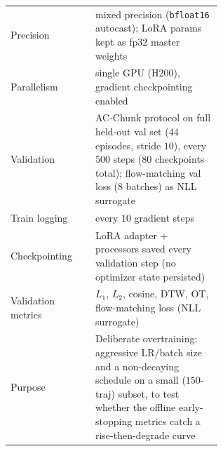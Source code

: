 \documentclass[english,12pt,a4paper,pdftex,elec,utf8]{aaltothesis}
\begin{document}
\begin{table}[t]
\begin{tabular}{@{}l p{0.60\linewidth}@{}}
    Precision                   & mixed precision (\texttt{bfloat16} autocast); LoRA params kept as fp32 master weights \\
    Parallelism                 & single GPU (H200), gradient checkpointing enabled \\
    \midrule
    Validation                  & AC-Chunk protocol on full held-out val set ($44$ episodes, stride $10$), every $500$ steps ($80$ checkpoints total); flow-matching val loss ($8$ batches) as NLL surrogate \\
    Train logging                & every $10$ gradient steps \\
    Checkpointing                & LoRA adapter + processors saved every validation step (no optimizer state persisted) \\
    Validation metrics          & $L_1$, $L_2$, cosine, DTW, OT, flow-matching loss (NLL surrogate) \\
    Purpose                     & Deliberate overtraining: aggressive LR/batch size and a non-decaying schedule on a small ($150$-traj) subset, to test whether the offline early-stopping metrics catch a rise-then-degrade curve \\
    \bottomrule
  \end{tabular}
\end{table}
\end{document}
